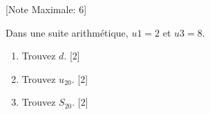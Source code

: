 \begin{question}
  \hspace*{\fill} [Note Maximale: 6]\par
  \noindent Dans une suite arithmétique, $u1 = 2$ et $u3 = 8$.\par
  \begin{enumerate}[label=(\alph*)]
    \item Trouvez $d$.\hspace*{\fill} [2]
    \item Trouvez $u_{20}$.\hspace*{\fill} [2]
    \item Trouvez $S_{20}$.\hspace*{\fill} [2]
  \end{enumerate}
\end{question}
